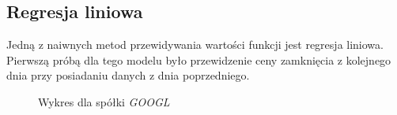 \documentclass[a4paper, twoside, 11pt, openright]{article}
\begin{document}
\subsection{Regresja liniowa}

Jedną z naiwnych metod przewidywania wartości funkcji jest regresja liniowa. Pierwszą próbą dla tego modelu było przewidzenie ceny zamknięcia z kolejnego dnia przy posiadaniu danych z dnia poprzedniego.

\begin{figure}[H]%
\centering
{}%
\qquad
{}%
\caption{Wykres dla spółki \textit{GOOGL}}
\label{linear_regression_1}
\end{figure}
\end{document}
